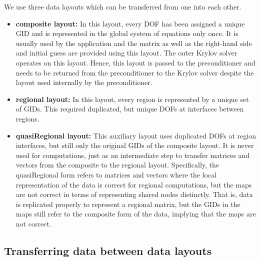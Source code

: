\documentclass[11pt]{article}
\begin{document}
We use three data layouts which can be transferred from one into each other.
\begin{itemize}
\item {\bf composite layout:} In this layout, every DOF has been assigned a unique GID and is represented in the global system of equations only once.
It is usually used by the application and the matrix as well as the right-hand side and initial guess are provided using this layout.
The outer Krylov solver operates on this layout. Hence, this layout is passed to the preconditioner and needs to be returned from the preconditioner
to the Krylov solver despite the layout used internally by the preconditioner.
\item {\bf regional layout:} In this layout, every region is represented by a unique set of GIDs. 
This required duplicated, but unique DOFs at interfaces between regions.
\item {\bf quasiRegional layout:} This auxiliary layout uses duplicated DOFs at region interfaces, 
but still only the original GIDs of the composite layout.
It is never used for computations, just as an intermediate step to transfer matrices and vectors from the composite to the regional layout.
Specifically, the quasiRegional form refers to matrices and vectors 
where the local representation of the data is correct for
regional computations, but the maps are not correct in terms of
representing shared nodes distinctly. That is, data is replicated properly
to represent a regional matrix, but the GIDs in the maps still refer to the composite form of the data, 
implying that the maps are not correct.
\end{itemize}

\subsection{Transferring data between data layouts}
\label{sec:TransferDataLayouts}
\end{document}
